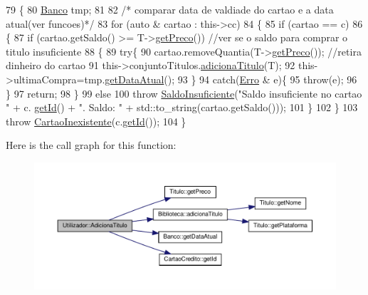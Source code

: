 \begin{DoxyCode}
79 \{
80     \hyperlink{classBanco}{Banco} tmp;
81 
82 \textcolor{comment}{/* comparar data de valdiade do cartao e a data atual(ver funcoes)*/}
83     \textcolor{keywordflow}{for} (\textcolor{keyword}{auto} & cartao : this->cc)
84     \{
85         \textcolor{keywordflow}{if} (cartao == c)
86         \{
87             \textcolor{keywordflow}{if} (cartao.getSaldo() >= T->\hyperlink{classTitulo_a93725bdc2e98350e47b54fd76c0fa236}{getPreco}()) \textcolor{comment}{//ver se o saldo para comprar o titulo
       insuficiente}
88             \{
89                 \textcolor{keywordflow}{try}\{
90                     cartao.removeQuantia(T->\hyperlink{classTitulo_a93725bdc2e98350e47b54fd76c0fa236}{getPreco}()); \textcolor{comment}{//retira dinheiro do cartao}
91                     this->conjuntoTitulos.\hyperlink{classBiblioteca_af10c9f23d85db8e03ae2e8b9d3e593e1}{adicionaTitulo}(T);
92                     this->ultimaCompra=tmp.\hyperlink{classBanco_a0735f07636c578666068a16f6ecccd91}{getDataAtual}();
93                 \}
94                 \textcolor{keywordflow}{catch}(\hyperlink{classErro}{Erro} & e)\{
95                     \textcolor{keywordflow}{throw}(e);
96                 \}
97                 \textcolor{keywordflow}{return};
98             \}
99             \textcolor{keywordflow}{else}
100                 \textcolor{keywordflow}{throw} \hyperlink{classSaldoInsuficiente}{SaldoInsuficiente}(\textcolor{stringliteral}{"Saldo insuficiente no cartao "} +  c.
      \hyperlink{classCartaoCredito_ab59d60e4d155e7f29aef888ea3139ee5}{getId}() + \textcolor{stringliteral}{". Saldo: "} + std::to\_string(cartao.getSaldo()));
101         \}
102     \}
103     \textcolor{keywordflow}{throw} \hyperlink{classCartaoInexistente}{CartaoInexistente}(c.\hyperlink{classCartaoCredito_ab59d60e4d155e7f29aef888ea3139ee5}{getId}());
104 \}
\end{DoxyCode}
Here is the call graph for this function\+:
\nopagebreak
\begin{figure}[H]
\begin{center}
\leavevmode
\includegraphics[width=350pt]{classUtilizador_ac08a744b9d9d2aca0bd22c60e0beaa83_cgraph}
\end{center}
\end{figure}
